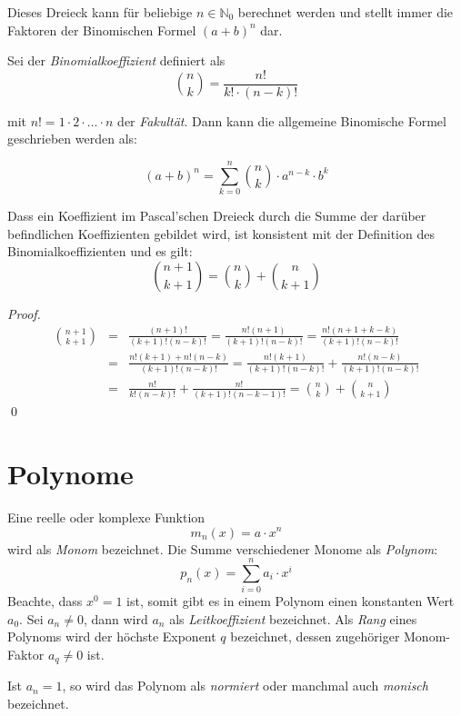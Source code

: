 Dieses Dreieck kann für beliebige $n\in \mathbb{N}_0$ berechnet werden und stellt immer die Faktoren der Binomischen Formel $(a+b)^n$ dar. 

\begin{definition}
Sei der \textsl{Binomialkoeffizient} definiert als 
\[
	\binom{n}{k} = \frac{n!}{k!\cdot (n-k)!}
\]
\end{definition}
mit $n! = 1\cdot 2\cdot ... \cdot n$ der \textsl{Fakultät}. Dann kann die allgemeine Binomische Formel geschrieben werden als:

\begin{equation}
(a+b)^n = \sum_{k=0}^{n} \binom{n}{k} \cdot a^{n-k}\cdot b^k
\end{equation}

\begin{claim}
Dass ein Koeffizient im Pascal'schen Dreieck durch die Summe der darüber befindlichen Koeffizienten gebildet wird, ist konsistent mit der Definition des Binomialkoeffizienten und es gilt:
\[
\binom{n+1}{k+1} = \binom{n}{k} + \binom{n}{k+1}
\]
\end{claim}

\begin{proof}
\begin{eqnarray*}
\binom{n+1}{k+1} &=& \frac{(n+1)!}{(k+1)!(n-k)!} = \frac{n!(n+1)}{(k+1)!(n-k)!} = \frac{n!(n+1+k-k)}{(k+1)!(n-k)!} \\
&=& \frac{n!(k+1) +n!(n-k)}{(k+1)!(n-k)!} = \frac{n!(k+1)}{(k+1)!(n-k)!}+\frac{n!(n-k)}{(k+1)!(n-k)!} \\
&=& \frac{n!}{k!(n-k)!} + \frac{n!}{(k+1)!(n-k-1)!} = \binom{n}{k}+\binom{n}{k+1}
\end{eqnarray*}
\qed
\end{proof}

\section{Polynome}\label{chap:poly}

\begin{definition}
Eine reelle oder komplexe Funktion
\[ m_n(x) = a\cdot x^n  \]
wird als \textsl{Monom} bezeichnet. Die Summe verschiedener Monome als \textsl{Polynom}:
\[
p_n(x) = \sum_{i=0}^{n} a_i \cdot x^i
\]
Beachte, dass $x^0 = 1$ ist, somit gibt es in einem Polynom einen konstanten Wert $a_0$. Sei $a_n\ne 0$, dann wird $a_n$ als \textsl{Leitkoeffizient} bezeichnet. Als \textsl{Rang} eines Polynoms wird der höchste Exponent $q$ bezeichnet, dessen zugehöriger Monom-Faktor $a_q \ne 0$ ist.

Ist $a_n = 1$, so wird das Polynom als \textsl{normiert} oder manchmal auch \textsl{monisch} bezeichnet.
\end{definition}


